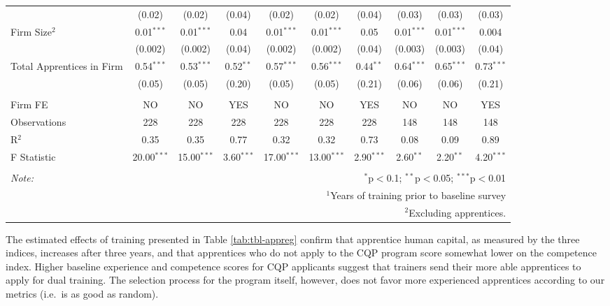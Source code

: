\documentclass[
  11pt,
a4paper
]{article}
\begin{document}
\begin{table}[H]
\begin{tabular}{@{\extracolsep{-8pt}}lccccccccc}
  & (0.02) & (0.02) & (0.04) & (0.02) & (0.02) & (0.04) & (0.03) & (0.03) & (0.03) \\ 
  Firm Size$^2$ & 0.01$^{***}$ & 0.01$^{***}$ & 0.04 & 0.01$^{***}$ & 0.01$^{***}$ & 0.05 & 0.01$^{***}$ & 0.01$^{***}$ & 0.004 \\ 
  & (0.002) & (0.002) & (0.04) & (0.002) & (0.002) & (0.04) & (0.003) & (0.003) & (0.04) \\ 
  Total Apprentices in Firm & 0.54$^{***}$ & 0.53$^{***}$ & 0.52$^{**}$ & 0.57$^{***}$ & 0.56$^{***}$ & 0.44$^{**}$ & 0.64$^{***}$ & 0.65$^{***}$ & 0.73$^{***}$ \\ 
  & (0.05) & (0.05) & (0.20) & (0.05) & (0.05) & (0.21) & (0.06) & (0.06) & (0.21) \\ 
 \hline \\[-1.8ex] 
Firm FE & NO & NO & YES & NO & NO & YES & NO & NO & YES \\ 
Observations & 228 & 228 & 228 & 228 & 228 & 228 & 148 & 148 & 148 \\ 
R$^{2}$ & 0.35 & 0.35 & 0.77 & 0.32 & 0.32 & 0.73 & 0.08 & 0.09 & 0.89 \\ 
F Statistic & 20.00$^{***}$ & 15.00$^{***}$ & 3.60$^{***}$ & 17.00$^{***}$ & 13.00$^{***}$ & 2.90$^{***}$ & 2.60$^{**}$ & 2.20$^{**}$ & 4.20$^{***}$ \\ 
\hline 
\hline \\[-1.8ex] 
\textit{Note:}  & \multicolumn{9}{r}{$^{*}$p$<$0.1; $^{**}$p$<$0.05; $^{***}$p$<$0.01} \\ 
 & \multicolumn{9}{r}{$^1$Years of training prior to baseline survey} \\ 
 & \multicolumn{9}{r}{$^2$Excluding apprentices.} \\ 
\end{tabular} 
\end{table}

\noindent The estimated effects of training presented in Table \ref{tab:tbl-appreg} confirm that apprentice human capital, as measured by the three indices, increases after three years, and that apprentices who do not apply to the CQP program score somewhat lower on the competence index. Higher baseline experience and competence scores for CQP applicants suggest that trainers send their more able apprentices to apply for dual training. The selection process for the program itself, however, does not favor more experienced apprentices according to our metrics (i.e.~is as good as random).
\end{document}
